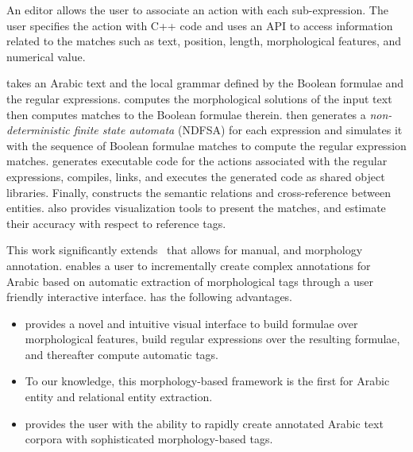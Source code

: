 An editor allows the user to associate an action with each sub-expression.
The user specifies the action with C++ code and uses an API to access information 
related to the matches such as text, position, length, morphological features, 
and numerical value.
%

\framework takes an Arabic text and the local grammar defined by the 
Boolean formulae and the regular expressions.
\framework computes the morphological solutions of the 
input text then computes matches to the Boolean formulae therein.
\framework then generates a {\em non-deterministic finite state 
automata} (NDFSA) for each expression and simulates it with the 
sequence of Boolean formulae matches to compute the regular 
expression matches. 
\framework generates executable code for the actions associated with
the regular expressions, 
compiles, links, and executes the generated code 
as shared object libraries.
Finally, \framework constructs the semantic relations and 
cross-reference between entities.
\framework also provides visualization tools to present the matches, 
and estimate their accuracy with respect to reference tags.

This work significantly extends~\cite{JaZaMatar} 
that allows for manual, and morphology annotation.
\framework enables a user to incrementally create 
complex annotations for Arabic based on automatic 
extraction of morphological tags through a user friendly interactive interface. 
\framework has the following advantages.
\begin{itemize}
  \item \framework provides a novel and intuitive visual interface to build formulae over morphological features, 
    build regular expressions over the resulting formulae, and thereafter compute automatic tags.
  \item To our knowledge, this morphology-based framework is the first for Arabic entity and relational entity extraction.
  \item \framework provides the user with the ability to rapidly create annotated Arabic text corpora with sophisticated morphology-based tags.
\end{itemize}

